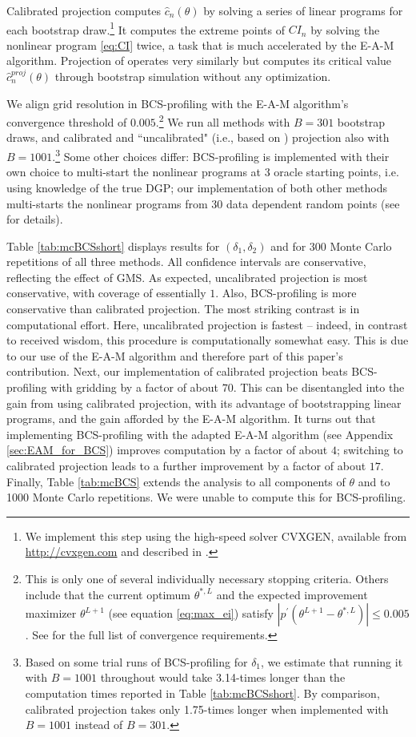 \documentclass[letterpaper,11pt]{article}
\theoremstyle{myplain}
\theoremstyle{mydefinition}
\theoremstyle{myremark}
\renewcommand{\cite}{\citet}
\numberwithin{equation}{section}
\numberwithin{figure}{section}
\begin{document}
\begin{appendix}
Calibrated projection computes $\hat{c}_n(\theta)$ by solving a series of linear programs for each bootstrap draw.\footnote{We implement this step using the high-speed solver CVXGEN, available from \url{http://cvxgen.com} and described in \cite{CVXGEN}.}  It computes the extreme points of $CI_n$ by solving the nonlinear program \eqref{eq:CI} twice, a task that is much accelerated by the E-A-M algorithm. Projection of \cite{AS} operates very similarly but computes its critical value $\hat{c}^{proj}_n(\theta)$ through bootstrap simulation without any optimization.  

We align grid resolution in BCS-profiling with the E-A-M algorithm's convergence threshold of $0.005$.\footnote{This is only one of several individually necessary stopping criteria. Others include that the current optimum $\theta^{*,L}$ and the expected improvement maximizer $\theta^{L+1}$ (see equation \eqref{eq:max_ei}) satisfy $|p^\prime (\theta^{L+1} - \theta^{*,L})| \le 0.005$. See \cite{KMST_code} for the full list of convergence requirements.} We run all methods with $B=301$ bootstrap draws, and calibrated and ``uncalibrated" (i.e., based on \cite{AS}) projection also with $B=1001$.\footnote{Based on some trial runs of BCS-profiling for $\delta_1$, we estimate that running it with $B=1001$ throughout would take 3.14-times longer than the computation times reported in Table \ref{tab:mcBCSshort}. By comparison, calibrated projection takes only 1.75-times longer when implemented with $B=1001$ instead of $B=301$.} Some other choices differ: BCS-profiling is implemented with their own choice to multi-start the nonlinear programs at 3 oracle starting points, i.e. using knowledge of the true DGP; our implementation of both other methods multi-starts the nonlinear programs from 30 data dependent random points (see \cite{KMST_code} for details).

Table \ref{tab:mcBCSshort} displays results for $(\delta_1,\delta_2)$ and for 300 Monte Carlo repetitions of all three methods. All confidence intervals are conservative, reflecting the effect of GMS. As expected, uncalibrated projection is most conservative, with coverage of essentially $1$. 
Also, BCS-profiling is more conservative than calibrated projection. The most striking contrast is in computational effort. Here, uncalibrated projection is fastest -- indeed, in contrast to received wisdom, this procedure is computationally somewhat easy. This is due to our use of the E-A-M algorithm and therefore part of this paper's contribution. Next, our implementation of calibrated projection beats BCS-profiling with gridding by a factor of about $70$. This can be disentangled into the gain from using calibrated projection, with its advantage of bootstrapping linear programs, and the gain afforded by the E-A-M algorithm. It turns out that implementing BCS-profiling with the adapted E-A-M algorithm (see Appendix \ref{sec:EAM_for_BCS}) improves computation by a factor of about $4$; switching to calibrated projection leads to a further improvement by a factor of about $17$. Finally, Table \ref{tab:mcBCS} extends the analysis to all components of $\theta$ and to 1000 Monte Carlo repetitions. We were unable to compute this for BCS-profiling.


\end{appendix}
\end{document}
